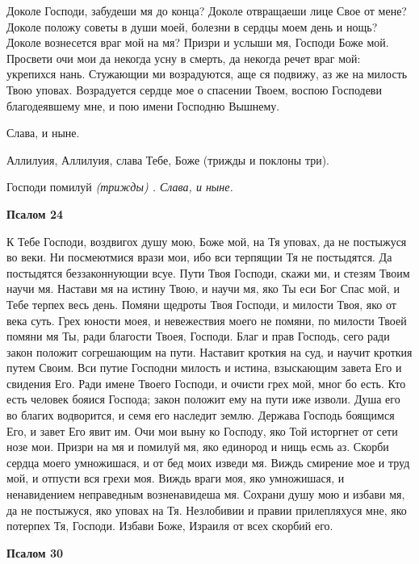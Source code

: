 Доколе Господи, забудеши мя до конца? Доколе отвращаеши лице Свое от мене? Доколе положу советы в души моей, болезни в сердцы моем день и нощь? Доколе вознесется враг мой на мя? Призри и услыши мя, Господи Боже мой. Просвети очи мои да некогда усну в смерть, да некогда речет враг мой: укрепихся нань. Стужающии ми возрадуются, аще ся подвижу, аз же на милость Твою уповах. Возрадуется сердце мое о спасении Твоем, воспою Господеви благодеявшему мне, и пою имени Господню Вышнему.


Слава, и ныне.


Аллилуия, Аллилуия, слава Тебе, Боже (трижды и поклоны три).


Господи помилуй \itshape (трижды)\normalfont{} . Слава, и ныне.







\bfseries Псалом 24\normalfont{}


К Тебе Господи, воздвигох душу мою, Боже мой, на Тя уповах, да не постыжуся во веки. Ни посмеютмися врази мои, ибо вси терпящии Тя не постыдятся. Да постыдятся беззаконнующии всуе. Пути Твоя Господи, скажи ми, и стезям Твоим научи мя. Настави мя на истину Твою, и научи мя, яко Ты еси Бог Спас мой, и Тебе терпех весь день. Помяни щедроты Твоя Господи, и милости Твоя, яко от века суть. Грех юности моея, и невежествия моего не помяни, по милости Твоей помяни мя Ты, ради благости Твоея, Господи. Благ и прав Господь, сего ради закон положит согрешающим на пути. Наставит кроткия на суд, и научит кроткия путем Своим. Вси путие Господни милость и истина, взыскающим завета Его и свидения Его. Ради имене Твоего Господи, и очисти грех мой, мног бо есть. Кто есть человек бояися Господа; закон положит ему на пути иже изволи. Душа его во благих водворится, и семя его наследит землю. Держава Господь боящимся Его, и завет Его явит им. Очи мои выну ко Господу, яко Той исторгнет от сети нозе мои. Призри на мя и помилуй мя, яко единород и нищь есмь аз. Скорби сердца моего умножишася, и от бед моих изведи мя. Виждь смирение мое и труд мой, и отпусти вся грехи моя. Виждь враги моя, яко умножишася, и ненавидением неправедным возненавидеша мя. Сохрани душу мою и избави мя, да не постыжуся, яко уповах на Тя. Незлобивии и правии прилепляхуся мне, яко потерпех Тя, Господи. Избави Боже, Израиля от всех скорбий его.







\bfseries Псалом 30\normalfont{}


